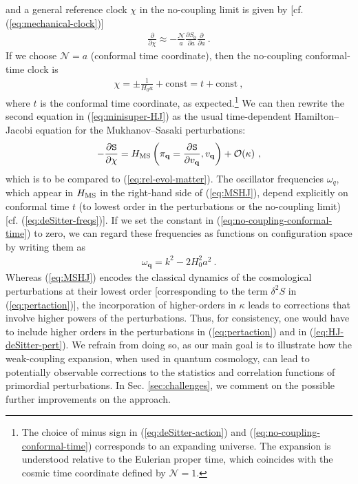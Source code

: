 \documentclass[12pt]{iopart}
\def\eq#1{\begin{equation}\begin{aligned}#1\end{aligned}\end{equation}}
\def\eref#1{(\ref{eq:#1})}
\def\del#1#2{\frac{\partial#1}{\partial#2}}
\def\S{\mathtt{S}}
\def\Ob{\mathcal{O}}
\def\N{\mathcal{N}}
\def\q{\mathbf{q}}
\begin{document}
and a general reference clock $\chi$ in the no-coupling limit is given by [cf. \eref{mechanical-clock}]
\eq{
\del{}{\chi} \approx -\frac{\N}{a}\del{S_0}{a}\del{}{a} \ .
}
If we choose $\N = a$ (conformal time coordinate), then the no-coupling conformal-time clock is
\eq{\label{eq:no-coupling-conformal-time}
\chi = \pm\frac{1}{H_0a} + \text{const} = t + \text{const} \ ,
}
where $t$ is the conformal time coordinate, as expected.\footnote{The choice of minus sign in \eref{deSitter-action} and \eref{no-coupling-conformal-time} corresponds to an expanding universe. The expansion is understood relative to the Eulerian proper time, which coincides with the cosmic time coordinate defined by $\N=1$.} We can then rewrite the second equation in \eref{minisuper-HJ} as the usual time-dependent Hamilton--Jacobi equation for the Mukhanov--Sasaki perturbations:
\eq{\label{eq:MSHJ}
-\del{\S}{\chi} = H_{\rm MS}\left(\pi_{\q}=\del{\S}{v_{\q}},v_{\q}\right)+\Ob(\kappa) \ ,
}
which is to be compared to \eref{rel-evol-matter}. The oscillator frequencies $\omega_{q}$, which appear in $H_{\rm MS}$ in the right-hand side of \eref{MSHJ}, depend explicitly on conformal time $t$ (to lowest order in the perturbations or the no-coupling limit) [cf. \eref{deSitter-freqs}]. If we set the constant in \eref{no-coupling-conformal-time} to zero, we can regard these frequencies as functions on configuration space by writing them as
\eq{\label{eq:deSitter-freqs-c}
\omega_{\q} = k^2-2H_0^2a^2 \ .
}
Whereas \eref{MSHJ} encodes the classical dynamics of the cosmological perturbations at their lowest order [corresponding to the term $\delta^2 S$ in \eref{pertaction}], the incorporation of higher-orders in $\kappa$ leads to corrections that involve higher powers of the perturbations. Thus, for consistency, one would have to include higher orders in the perturbations in \eref{pertaction} and in \eref{HJ-deSitter-pert}. We refrain from doing so, as our main goal is to illustrate how the weak-coupling expansion, when used in quantum cosmology, can lead to potentially observable corrections to the statistics and correlation functions of primordial perturbations. In Sec. \ref{sec:challenges}, we comment on the possible further improvements on the approach.
\end{document}
